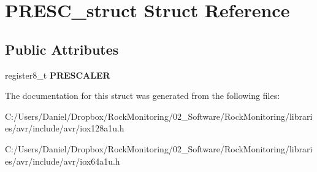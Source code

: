 \hypertarget{struct_p_r_e_s_c__struct}{}\section{P\+R\+E\+S\+C\+\_\+struct Struct Reference}
\label{struct_p_r_e_s_c__struct}
\subsection*{Public Attributes}
\begin{DoxyCompactItemize}
\item 
register8\+\_\+t {\bfseries P\+R\+E\+S\+C\+A\+L\+ER}\hypertarget{struct_p_r_e_s_c__struct_a0ef091bcbc8b3105dcddfa0474215178}{}\label{struct_p_r_e_s_c__struct_a0ef091bcbc8b3105dcddfa0474215178}

\end{DoxyCompactItemize}


The documentation for this struct was generated from the following files\+:\begin{DoxyCompactItemize}
\item 
C\+:/\+Users/\+Daniel/\+Dropbox/\+Rock\+Monitoring/02\+\_\+\+Software/\+Rock\+Monitoring/libraries/avr/include/avr/iox128a1u.\+h\item 
C\+:/\+Users/\+Daniel/\+Dropbox/\+Rock\+Monitoring/02\+\_\+\+Software/\+Rock\+Monitoring/libraries/avr/include/avr/iox64a1u.\+h\end{DoxyCompactItemize}
